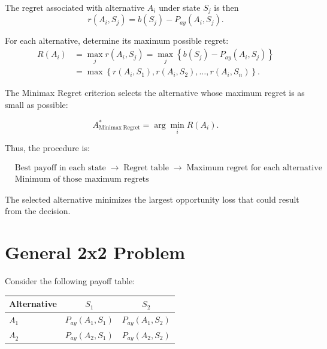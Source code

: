 	The regret associated with alternative $A_i$ under state $S_j$ is then
	\[
	r(A_i,S_j)
	=
	b(S_j)-P_{ay}(A_i,S_j).
	\]
	
	For each alternative, determine its maximum possible regret:
	\[
	\begin{aligned}
		R(A_i)
		&=
		\max_j r(A_i,S_j)
		=
		\max_j
		\left\{
		b(S_j)-P_{ay}(A_i,S_j)
		\right\}
		\\
		&=
		\max
		\left\{
		r(A_i,S_1),
		r(A_i,S_2),
		\ldots,
		r(A_i,S_n)
		\right\}.
	\end{aligned}
	\]
	
	The Minimax Regret criterion selects the alternative whose maximum regret
	is as small as possible:
	
	\[
	A^*_{\mathrm{Minimax\ Regret}}
	=
	\arg\min_i R(A_i).
	\]
	
	Thus, the procedure is:
	
	\[
	\boxed{
		\begin{aligned}
			&\text{Best payoff in each state}
			\;\longrightarrow\;
			\text{Regret table}
			\;\longrightarrow\;
			\text{Maximum regret for each alternative}
			\\
			&\text{Minimum of those maximum regrets}
		\end{aligned}
	}
	\]
	
	The selected alternative minimizes the largest opportunity loss that
	could result from the decision.
	
	
	
	\section{General 2x2 Problem}
	
	Consider the following payoff table:
	
	\begin{center}
		\renewcommand{\arraystretch}{1.3}
		\begin{tabular}{lcc}
			\toprule
			Alternative & $S_1$ & $S_2$ \\
			\midrule
			$A_1$
			& $P_{ay}(A_1,S_1)$
			& $P_{ay}(A_1,S_2)$
			\\
			
			$A_2$
			& $P_{ay}(A_2,S_1)$
			& $P_{ay}(A_2,S_2)$
			\\
			\bottomrule
		\end{tabular}
	\end{center}
	
